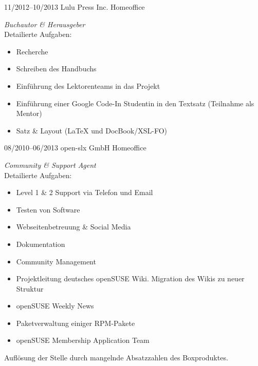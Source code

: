 \documentclass[a4paper]{friggeri-cv} %
\begin{document}
\begin{entrylist}
\entry
{11/2012--10/2013}
{Lulu Press Inc.}
{Homeoffice}
{\emph{Buchautor \& Herausgeber}\\
    Detailierte Aufgaben:
    \begin{itemize}
        \item Recherche
        \item Schreiben des Handbuchs
        \item Einführung des Lektorenteams in das Projekt
        \item Einführung einer Google Code-In Studentin in den Textsatz (Teilnahme als Mentor)
        \item Satz \& Layout (\LaTeX{} und DocBook/XSL-FO)
    \end{itemize}
}
\entry
{08/2010--06/2013}
{open-slx GmbH}
{Homeoffice}
{\emph{Community \& Support Agent} \\
    Detailierte Aufgaben:
    \begin{itemize}
        \item Level 1 \& 2 Support via Telefon und Email
        \item Testen von Software
        \item Webseitenbetreuung \& Social Media
        \item Dokumentation
        \item Community Management
        \item Projektleitung deutsches openSUSE Wiki. Migration des Wikis zu neuer Struktur
        \item openSUSE Weekly News
        \item Paketverwaltung einiger RPM-Pakete
        \item openSUSE Membership Application Team
    \end{itemize}
Auflösung der Stelle durch mangelnde Absatzzahlen des Boxproduktes.
}
\end{entrylist}
\end{document}
